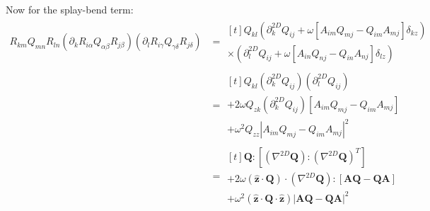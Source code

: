 \documentclass[reqno]{article}
\newcommand{\Q}{\mathbf{Q}}
\newcommand{\A}{\mathbf{A}}
\newcommand{\z}{\mathbf{\hat{z}}}
\begin{document}
Now for the splay-bend term:
\begin{equation}
\begin{split}
    R_{km} Q_{mn} R_{ln} 
    (\partial_k R_{i\alpha} Q_{\alpha \beta} R_{j \beta}) 
    (\partial_l R_{i \gamma} Q_{\gamma \delta} R_{j \delta})
    &=
    \begin{multlined}[t]
        Q_{kl}
        \left( 
            \partial^{2D}_k Q_{ij}
            + \omega \left[
                A_{im} Q_{mj} - Q_{im} A_{mj}
            \right] \delta_{kz}
        \right)\\
        \times \left( 
            \partial^{2D}_l Q_{ij}
            + \omega \left[
                A_{in} Q_{nj} - Q_{in} A_{nj}
            \right] \delta_{lz}
        \right)
    \end{multlined} \\
    &=
    \begin{multlined}[t]
        Q_{kl} \left( \partial^{2D}_k Q_{ij} \right) \left( \partial^{2D}_l Q_{ij} \right) \\
        + 2 \omega Q_{zk} \left( \partial^{2D}_k Q_{ij} \right) \left[
            A_{im} Q_{mj} - Q_{im} A_{mj}
        \right] \\
        + \omega^2 Q_{zz} \left| A_{im} Q_{mj} - Q_{im} A_{mj} \right|^2
    \end{multlined} \\
    &=
    \begin{multlined}[t]
        \Q : \left[ \left( \nabla^{2D} \Q \right) : \left( \nabla^{2D} \Q \right)^T \right] \\
        + 2 \omega \left( \z \cdot \Q\right) \cdot \left( \nabla^{2D} \Q \right) : \left[
            \A \Q - \Q \A
        \right] \\
        + \omega^2 \left( \z \cdot \Q \cdot \z \right) \left| \A \Q - \Q \A \right|^2
    \end{multlined}
\end{split}
\end{equation}
\end{document}
